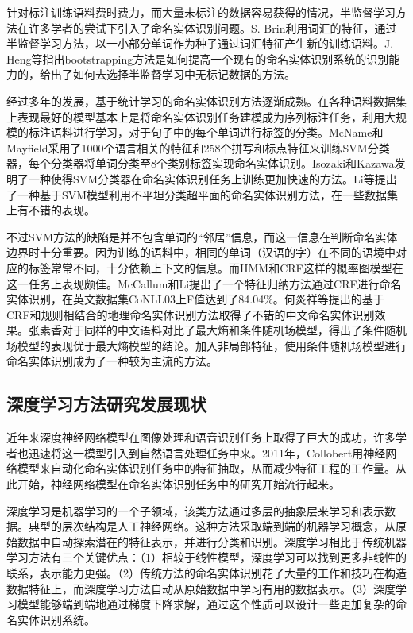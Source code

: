 \documentclass[winfonts,master,oneside,nobackinfo]{njuthesis}
\begin{document}
针对标注训练语料费时费力，而大量未标注的数据容易获得的情况，半监督学习方法在许多学者的尝试下引入了命名实体识别问题。S. Brin\cite{Brin}利用词汇的特征，通过半监督学习方法，以一小部分单词作为种子通过词汇特征产生新的训练语料。J. Heng\cite{Heng}等指出bootstrapping方法是如何提高一个现有的命名实体识别系统的识别能力的，给出了如何去选择半监督学习中无标记数据的方法。

经过多年的发展，基于统计学习的命名实体识别方法逐渐成熟。在各种语料数据集上表现最好的模型基本上是将命名实体识别任务建模成为序列标注任务，利用大规模的标注语料进行学习，对于句子中的每个单词进行标签的分类。McName和Mayfield\cite{McName}采用了1000个语言相关的特征和258个拼写和标点特征来训练SVM分类器，每个分类器将单词分类至8个类别标签实现命名实体识别。Isozaki和Kazawa\cite{Isozki}发明了一种使得SVM分类器在命名实体识别任务上训练更加快速的方法。Li\cite{Li}等提出了一种基于SVM模型利用不平坦分类超平面的命名实体识别方法，在一些数据集上有不错的表现。

不过SVM方法的缺陷是并不包含单词的“邻居”信息，而这一信息在判断命名实体边界时十分重要。因为训练的语料中，相同的单词（汉语的字）在不同的语境中对应的标签常常不同，十分依赖上下文的信息。而HMM和CRF这样的概率图模型在这一任务上表现颇佳。McCallum和Li\cite{McCallum}提出了一个特征归纳方法通过CRF进行命名实体识别，在英文数据集CoNLL03上F值达到了84.04\%。何炎祥等\cite{hyx}提出的基于CRF和规则相结合的地理命名实体识别方法取得了不错的中文命名实体识别效果。张素香\cite{zsx}对于同样的中文语料对比了最大熵和条件随机场模型，得出了条件随机场模型的表现优于最大熵模型的结论。加入非局部特征，使用条件随机场模型进行命名实体识别成为了一种较为主流的方法。

\subsection{深度学习方法研究发展现状}
近年来深度神经网络模型在图像处理和语音识别任务上取得了巨大的成功，许多学者也迅速将这一模型引入到自然语言处理任务中来。2011年，Collobert\cite{Collobert}用神经网络模型来自动化命名实体识别任务中的特征抽取，从而减少特征工程的工作量。从此开始，神经网络模型在命名实体识别任务中的研究开始流行起来。

深度学习是机器学习的一个子领域，该类方法通过多层的抽象层来学习和表示数据。典型的层次结构是人工神经网络。这种方法采取端到端的机器学习概念，从原始数据中自动探索潜在的特征表示，并进行分类和识别。深度学习相比于传统机器学习方法有三个关键优点：（1）相较于线性模型，深度学习可以找到更多非线性的联系，表示能力更强。（2）传统方法的命名实体识别花了大量的工作和技巧在构造数据特征上，而深度学习方法自动从原始数据中学习有用的数据表示。（3）深度学习模型能够端到端地通过梯度下降求解，通过这个性质可以设计一些更加复杂的命名实体识别系统。
\end{document}

